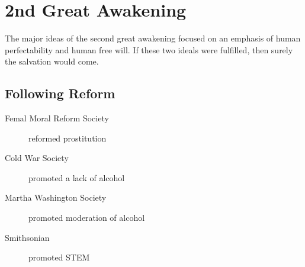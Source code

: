 \section{2nd Great Awakening}
The major ideas of the second great awakening focused on an emphasis of human
perfectability and human free will.  If these two ideals were fulfilled, then
surely the salvation would come.

\subsection{Following Reform}
\begin{description}
  \item[Femal Moral Reform Society] reformed prostitution
  \item[Cold War Society] promoted a lack of alcohol
  \item[Martha Washington Society] promoted moderation of alcohol
  \item[Smithsonian] promoted STEM
\end{description}
